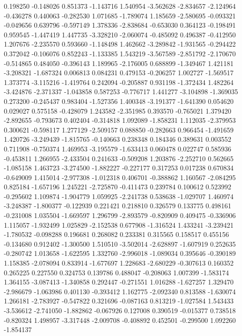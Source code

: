 0.198250
-0.148026
0.851373
-1.143716
1.540954
-3.562628
-2.834657
-2.124964
-0.436278
0.440063
-0.282530
1.071685
-1.789074
1.185659
-2.580695
-0.093321
-0.049656
0.639796
-0.597149
1.378336
-2.838684
-0.653030
0.364123
-0.198491
0.959545
-1.447419
1.447735
-3.328210
-2.060074
-0.485092
0.496387
-0.412950
1.207676
-2.235570
0.593660
-1.148498
1.462662
-3.289842
-1.931565
-0.294422
0.372042
-0.106076
0.852243
-1.133385
1.543219
-3.567589
-2.851792
-2.170670
-0.514865
0.484050
-0.396143
1.189965
-2.176005
0.688899
-1.349467
1.421181
-3.208321
-1.687324
0.006813
0.084231
0.479153
-0.206257
1.002727
-1.569517
1.373774
-3.115216
-1.419764
0.242094
-0.205887
0.931198
-1.372434
1.482264
-3.424876
-2.371337
-1.043858
0.587253
-0.776717
1.441277
-3.104898
-1.369035
0.273200
-0.245437
0.983404
-1.527356
1.400348
-3.191377
-1.641390
0.054620
0.029027
0.575158
-0.428079
1.243582
-2.351985
0.393570
-0.765021
1.379420
-2.892655
-0.793673
0.402404
-0.314818
1.092089
-1.858231
1.112035
-2.379953
0.300621
-0.598117
1.277129
-2.509157
0.088850
-0.282663
0.966454
-1.491659
1.420726
-3.249439
-1.815765
-0.140663
0.238348
0.184346
0.389631
0.003552
0.711908
-0.750374
1.469953
-3.195579
-1.633413
0.060478
0.022747
0.585936
-0.453811
1.266955
-2.433504
0.241633
-0.509208
1.203876
-2.252710
0.562665
-1.085158
1.463723
-3.274500
-1.882227
-0.227177
0.317253
0.017238
0.670834
-0.649009
1.415014
-2.977308
-1.012318
0.406701
-0.388862
1.160567
-2.084295
0.825184
-1.657196
1.245221
-2.725870
-0.411473
0.239784
0.100612
0.523992
-0.295602
1.109874
-1.904779
1.059925
-2.241738
0.538638
-1.029707
1.460974
-3.248387
-1.800377
-0.122939
0.221421
0.218810
0.326579
0.133775
0.498161
-0.231008
1.035504
-1.669597
1.296799
-2.893579
-0.820909
0.409475
-0.336906
1.115057
-1.932499
1.025829
-2.152538
0.677908
-1.316524
1.433241
-3.239421
-1.780532
-0.098288
0.196681
0.268082
0.233381
0.315565
0.158517
0.455156
-0.134680
0.912402
-1.300500
1.510510
-3.502014
-2.628897
-1.607919
0.252635
-0.280742
1.013658
-1.622595
1.332760
-2.996018
-1.089034
0.395646
-0.390189
1.158385
-2.078094
0.833914
-1.677697
1.228683
-2.680229
-0.307613
0.160352
0.265225
0.227550
0.324753
0.139786
0.488047
-0.208063
1.007399
-1.583174
1.364155
-3.087413
-1.340858
0.292447
-0.271551
1.016288
-1.627257
1.329470
-2.986679
-1.063986
0.401130
-0.393412
1.162775
-2.092340
0.813588
-1.630074
1.266181
-2.783927
-0.547822
0.321696
-0.087163
0.813219
-1.027584
1.543433
-3.536612
-2.741050
-1.882862
-0.067926
0.127008
0.390519
-0.015377
0.738518
-0.820324
1.498957
-3.317448
-2.009708
-0.408892
0.452501
-0.299500
1.092260
-1.854137
